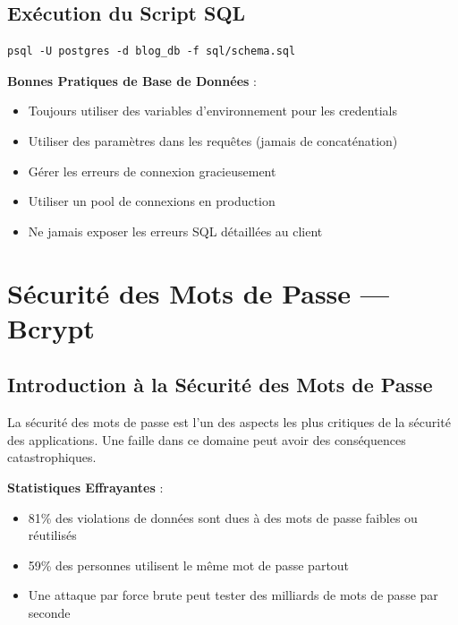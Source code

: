 \section{Exécution du Script SQL}

\begin{lstlisting}[style=bash, caption=Exécution du script schema.sql]
psql -U postgres -d blog_db -f sql/schema.sql
\end{lstlisting}

\begin{bestpracticebox}
    \textbf{Bonnes Pratiques de Base de Données} :
    \begin{itemize}
        \item Toujours utiliser des variables d'environnement pour les credentials
        \item Utiliser des paramètres dans les requêtes (jamais de concaténation)
        \item Gérer les erreurs de connexion gracieusement
        \item Utiliser un pool de connexions en production
        \item Ne jamais exposer les erreurs SQL détaillées au client
    \end{itemize}
\end{bestpracticebox}

\chapter{Sécurité des Mots de Passe — Bcrypt}

\section{Introduction à la Sécurité des Mots de Passe}

La sécurité des mots de passe est l'un des aspects les plus critiques de la sécurité des applications. Une faille dans ce domaine peut avoir des conséquences catastrophiques.

\begin{securitybox}
    \textbf{Statistiques Effrayantes} :
    \begin{itemize}
        \item 81\% des violations de données sont dues à des mots de passe faibles ou réutilisés
        \item 59\% des personnes utilisent le même mot de passe partout
        \item Une attaque par force brute peut tester des milliards de mots de passe par seconde
    \end{itemize}
\end{securitybox}

